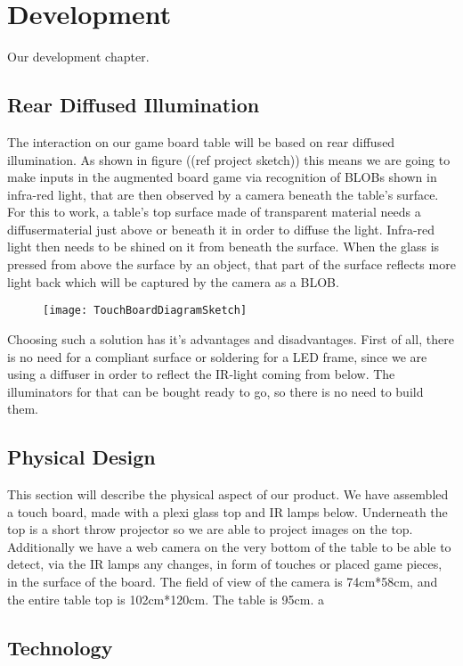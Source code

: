 \chapter{Development}\label{ch:development}
Our development chapter. 

\section{Rear Diffused Illumination}
The interaction on our game board table will be based on rear diffused illumination.\citep{multiTT} As shown in figure ((ref project sketch)) this means we are going to make inputs in the augmented board game via recognition of BLOBs shown in infra-red light, that are then observed by a camera beneath the table's surface. 
For this to work, a table's top surface made of transparent material needs a diffusermaterial just above or beneath it in order to diffuse the light. Infra-red light then needs to be shined on it from beneath the surface. When the glass is pressed from above the surface by an object, that part of the surface reflects more light back which will be captured by the camera as a BLOB.

\begin{figure}[!h]
\centering	\texttt{[image: TouchBoardDiagramSketch]}
\end{figure}

Choosing such a solution has it's advantages and disadvantages. First of all, there is no need for a compliant surface or soldering for a LED frame, since we are using a diffuser in order to reflect the IR-light coming from below. The illuminators for that can be bought ready to go, so there is no need to build them. 

\section{Physical Design} 
This section will describe the physical aspect of our product.
We have assembled a touch board, made with a plexi glass top and IR lamps below. Underneath the top is a short throw projector so we are able to project images on the top. Additionally we have a web camera on the very bottom of the table to be able to detect, via the IR lamps any changes, in form of touches or placed game pieces, in the surface of the board. 
The field of view of the camera is 74cm*58cm, and the entire table top is 102cm*120cm. The table is 95cm. 
a

\section{Technology}


